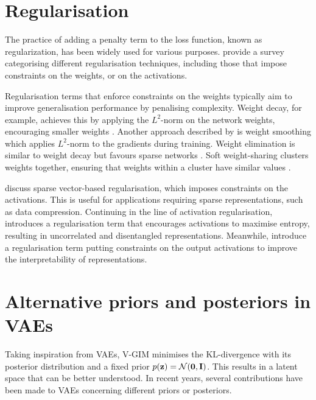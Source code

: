 	
	

\section{Regularisation}
	The practice of adding a penalty term to the loss function, known as regularization, has been widely used for various purposes. \cite{kukackaRegularizationDeepLearning2017} provide a survey categorising different regularisation techniques, including those that impose constraints on the weights, or on the activations.
	
	Regularisation terms that enforce constraints on the weights typically aim to improve generalisation performance by penalising complexity. Weight decay, for example, achieves this by applying the $L^2$-norm on the network weights, encouraging smaller weights \citep{gneccoWeightdecayTechniqueLearning2009}. Another approach described by \cite{kukackaRegularizationDeepLearning2017} is weight smoothing which applies $L^2$-norm to the gradients during training. Weight elimination is similar to weight decay but favours sparse networks \citep{weigendGeneralizationWeightEliminationApplication1990}. Soft weight-sharing clusters weights together, ensuring that weights within a cluster have similar values \citep{nowlanSimplifyingNeuralNetworks1992}.
	
	\cite{tianComprehensiveSurveyRegularization2022} discuss sparse vector-based regularisation, which imposes constraints on the activations. This is useful for applications requiring sparse representations, such as data compression. Continuing in the line of activation regularisation, \cite{tomczakLearningInformativeFeatures2016} introduces a regularisation term that encourages activations to maximise entropy, resulting in uncorrelated and disentangled representations. Meanwhile, \cite{wuImprovingInterpretabilityRegularization2018} introduce a regularisation term putting constraints on the output activations to improve the interpretability of representations.


\section{Alternative priors and posteriors in VAEs} \label{cha:rel_alt_priors}
	Taking inspiration from VAEs, V-GIM minimises the KL-divergence with its posterior distribution and a fixed prior $p(\mathbf{z})=\mathcal{N}(\bm{\mathbf{0}}, \mathbf{I})$. This results in a latent space that can be better understood. In recent years, several contributions have been made to VAEs concerning different priors or posteriors.
	
